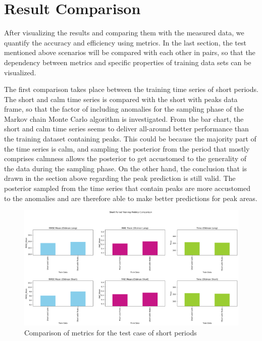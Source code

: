 \section{Result Comparison}
After visualizing the results and comparing them with the measured data, we quantify the accuracy and efficiency using metrics. In the last section, the test mentioned above scenarios will be compared with each other in pairs, so that the dependency between metrics and specific properties of training data sets can be visualized.

The first comparison takes place between the training time series of short periods. The short and calm time series is compared with the short with peaks data frame, so that the factor of including anomalies for the sampling phase of the Markov chain Monte Carlo algorithm is investigated. From the bar chart, the short and calm time series seems to deliver all-around better performance than the training dataset containing peaks. This could be because the majority part of the time series is calm, and sampling the posterior from the period that mostly comprises calmness allows the posterior to get accustomed to the generality of the data during the sampling phase. On the other hand, the conclusion that is drawn in the section above regarding the peak prediction is still valid. The posterior sampled from the time series that contain peaks are more accustomed to the anomalies and are therefore able to make better predictions for peak areas.


\begin{figure}[H]
    \centering
    \includegraphics[width=.8\textwidth]{figures/time_series_analysis/comparison/short_period.png}
    \captionsetup{width=.8\textwidth}
    \caption{Comparison of metrics for the test case of short periods}
    \label{fig:enter-label}
\end{figure}

